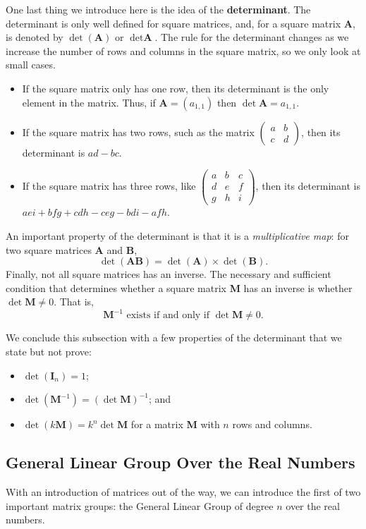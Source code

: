 One last thing we introduce here is the idea of the \textbf{determinant}. The determinant is only well defined for square matrices, and, for a square matrix $\textbf{A}$, is denoted by $\det(\textbf{A})$ or $\det \textbf{A}$. The rule for the determinant changes as we increase the number of rows and columns in the square matrix, so we only look at small cases.
\begin{itemize}
    \item If the square matrix only has one row, then its determinant is the only element in the matrix. Thus, if $\textbf{A} = (a_{1,1})$ then $\det \textbf{A} = a_{1,1}$.
    \item If the square matrix has two rows, such as the matrix $\begin{pmatrix}a & b\\c & d\end{pmatrix}$, then its determinant is $ad-bc$.
    \item If the square matrix has three rows, like $\begin{pmatrix}a & b & c \\ d & e & f \\ g & h & i\end{pmatrix}$, then its determinant is $aei+bfg+cdh-ceg-bdi-afh$.
\end{itemize}
An important property of the determinant is that it is a \textit{multiplicative map}: for two square matrices \textbf{A} and \textbf{B},
\[
    \det (\textbf{AB}) = \det(\textbf{A}) \times \det(\textbf{B}).
\]
Finally, not all square matrices has an inverse. The necessary and sufficient condition that determines whether a square matrix \textbf{M} has an inverse is whether $\det \textbf{M} \neq 0$. That is,
\[
    \textbf{M}^{-1} \text{ exists if and only if } \det \textbf{M} \neq 0.
\]

We conclude this subsection with a few properties of the determinant that we state but not prove:
\begin{itemize}
    \item $\det(\textbf{I}_n) = 1$;
    \item $\det(\textbf{M}^{-1}) = \left(\det \textbf{M}\right)^{-1}$; and
    \item $\det(k\textbf{M}) = k^n \det\textbf{M}$ for a matrix \textbf{M} with $n$ rows and columns.
\end{itemize}

\subsection{General Linear Group Over the Real Numbers}\label{subsection-GLR-matrix-group}
With an introduction of matrices out of the way, we can introduce the first of two important matrix groups: the General Linear Group of degree $n$ over the real numbers.

